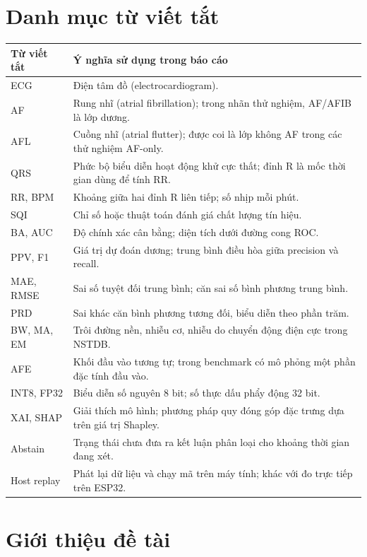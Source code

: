 \documentclass[12pt,a4paper,oneside]{report}
\begin{document}
\chapter*{Danh mục từ viết tắt}
\begin{longtable}{L{2.4cm}L{12.4cm}}
\toprule
Từ viết tắt & Ý nghĩa sử dụng trong báo cáo\\\midrule
ECG & Điện tâm đồ (electrocardiogram).\\
AF & Rung nhĩ (atrial fibrillation); trong nhãn thử nghiệm, AF/AFIB là lớp dương.\\
AFL & Cuồng nhĩ (atrial flutter); được coi là lớp không AF trong các thử nghiệm AF-only.\\
QRS & Phức bộ biểu diễn hoạt động khử cực thất; đỉnh R là mốc thời gian dùng để tính RR.\\
RR, BPM & Khoảng giữa hai đỉnh R liên tiếp; số nhịp mỗi phút.\\
SQI & Chỉ số hoặc thuật toán đánh giá chất lượng tín hiệu.\\
BA, AUC & Độ chính xác cân bằng; diện tích dưới đường cong ROC.\\
PPV, F1 & Giá trị dự đoán dương; trung bình điều hòa giữa precision và recall.\\
MAE, RMSE & Sai số tuyệt đối trung bình; căn sai số bình phương trung bình.\\
PRD & Sai khác căn bình phương tương đối, biểu diễn theo phần trăm.\\
BW, MA, EM & Trôi đường nền, nhiễu cơ, nhiễu do chuyển động điện cực trong NSTDB.\\
AFE & Khối đầu vào tương tự; trong benchmark có mô phỏng một phần đặc tính đầu vào.\\
INT8, FP32 & Biểu diễn số nguyên 8 bit; số thực dấu phẩy động 32 bit.\\
XAI, SHAP & Giải thích mô hình; phương pháp quy đóng góp đặc trưng dựa trên giá trị Shapley.\\
Abstain & Trạng thái chưa đưa ra kết luận phân loại cho khoảng thời gian đang xét.\\
Host replay & Phát lại dữ liệu và chạy mã trên máy tính; khác với đo trực tiếp trên ESP32.\\
\bottomrule
\end{longtable}
\clearpage
{}

\chapter{Giới thiệu đề tài}
\end{document}
